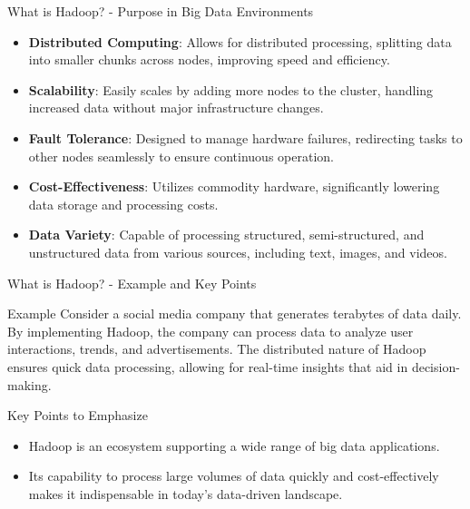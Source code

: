 \documentclass[aspectratio=169]{beamer}
\begin{document}
\begin{frame}[fragile]{What is Hadoop? - Purpose in Big Data Environments}
    \begin{itemize}
        \item \textbf{Distributed Computing}: Allows for distributed processing, splitting data into smaller chunks across nodes, improving speed and efficiency.
        
        \item \textbf{Scalability}: Easily scales by adding more nodes to the cluster, handling increased data without major infrastructure changes.
        
        \item \textbf{Fault Tolerance}: Designed to manage hardware failures, redirecting tasks to other nodes seamlessly to ensure continuous operation.
        
        \item \textbf{Cost-Effectiveness}: Utilizes commodity hardware, significantly lowering data storage and processing costs.
        
        \item \textbf{Data Variety}: Capable of processing structured, semi-structured, and unstructured data from various sources, including text, images, and videos.
    \end{itemize}
\end{frame}

\begin{frame}[fragile]{What is Hadoop? - Example and Key Points}
    \begin{block}{Example}
        Consider a social media company that generates terabytes of data daily. By implementing Hadoop, the company can process data to analyze user interactions, trends, and advertisements. The distributed nature of Hadoop ensures quick data processing, allowing for real-time insights that aid in decision-making.
    \end{block}

    \begin{block}{Key Points to Emphasize}
        \begin{itemize}
            \item Hadoop is an ecosystem supporting a wide range of big data applications.
            
            \item Its capability to process large volumes of data quickly and cost-effectively makes it indispensable in today's data-driven landscape.
        \end{itemize}
    \end{block}
\end{frame}
\end{document}
